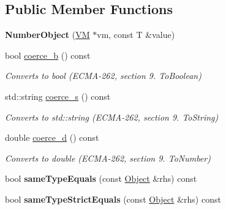 \subsection*{Public Member Functions}
\begin{DoxyCompactItemize}
\item 
\hypertarget{classjswf_1_1avm2_1_1_number_object_afd6f25846d1060b5cc179048e0c94b33}{{\bfseries Number\+Object} (\hyperlink{classjswf_1_1avm2_1_1_v_m}{V\+M} $\ast$vm, const T \&value)}\label{classjswf_1_1avm2_1_1_number_object_afd6f25846d1060b5cc179048e0c94b33}

\item 
\hypertarget{classjswf_1_1avm2_1_1_number_object_a2514993b781c018e62cb53dba51378ad}{bool \hyperlink{classjswf_1_1avm2_1_1_number_object_a2514993b781c018e62cb53dba51378ad}{coerce\+\_\+b} () const }\label{classjswf_1_1avm2_1_1_number_object_a2514993b781c018e62cb53dba51378ad}

\begin{DoxyCompactList}\small\item\em Converts to {\ttfamily bool} (E\+C\+M\+A-\/262, section 9. {\itshape To\+Boolean}) \end{DoxyCompactList}\item 
std\+::string \hyperlink{classjswf_1_1avm2_1_1_number_object_ae739a9db414d4c5924faaa549384a24c}{coerce\+\_\+s} () const 
\begin{DoxyCompactList}\small\item\em Converts to {\ttfamily std\+::string} (E\+C\+M\+A-\/262, section 9. {\itshape To\+String}) \end{DoxyCompactList}\item 
\hypertarget{classjswf_1_1avm2_1_1_number_object_a46b26e8ee57e4140d830196b50ea5714}{double \hyperlink{classjswf_1_1avm2_1_1_number_object_a46b26e8ee57e4140d830196b50ea5714}{coerce\+\_\+d} () const }\label{classjswf_1_1avm2_1_1_number_object_a46b26e8ee57e4140d830196b50ea5714}

\begin{DoxyCompactList}\small\item\em Converts to {\ttfamily double} (E\+C\+M\+A-\/262, section 9. {\itshape To\+Number}) \end{DoxyCompactList}\item 
\hypertarget{classjswf_1_1avm2_1_1_number_object_a227caf4e09dbbb48af123db295455a95}{bool {\bfseries same\+Type\+Equals} (const \hyperlink{classjswf_1_1avm2_1_1_object}{Object} \&rhs) const }\label{classjswf_1_1avm2_1_1_number_object_a227caf4e09dbbb48af123db295455a95}

\item 
\hypertarget{classjswf_1_1avm2_1_1_number_object_a9831edc4607ba7ff6773911b48ca7eec}{bool {\bfseries same\+Type\+Strict\+Equals} (const \hyperlink{classjswf_1_1avm2_1_1_object}{Object} \&rhs) const }\label{classjswf_1_1avm2_1_1_number_object_a9831edc4607ba7ff6773911b48ca7eec}

\end{DoxyCompactItemize}

